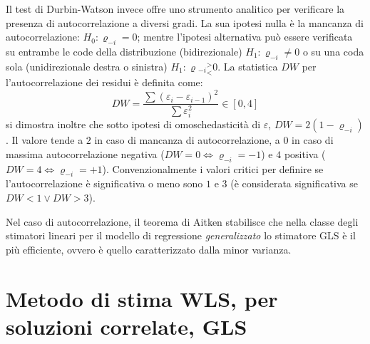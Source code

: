 \documentclass[a4page, 11pt]{article} %
\begin{document}
Il test di Durbin-Watson invece offre uno strumento analitico per verificare la presenza di autocorrelazione a diversi gradi.
La sua ipotesi nulla è la mancanza di autocorrelazione: $H_0: \varrho_{-i} = 0$; mentre l'ipotesi alternativa può essere verificata su entrambe le code della distribuzione (bidirezionale) $H_1: \varrho_{-i} \neq 0$ o su una coda sola (unidirezionale destra o sinistra) $H_1: \varrho{_{-i}} ^>_< 0$.
La statistica $DW$ per l'autocorrelazione dei residui è definita come:
\begin{equation*}
  DW = \frac{\sum{(\varepsilon_i - \varepsilon_{i-1})^2}}{\sum{ \varepsilon_i^2}} \in [0, 4]
\end{equation*}
si dimostra inoltre che sotto ipotesi di omoschedasticità di $\varepsilon$, $DW = 2(1 - \varrho_{-i})$.
Il valore tende a $2$ in caso di mancanza di autocorrelazione, a $0$ in caso di massima autocorrelazione negativa ($DW = 0 \Leftrightarrow \varrho_{-i} = -1$) e $4$ positiva ($DW = 4 \Leftrightarrow \varrho_{-i} = +1$).
Convenzionalmente i valori critici per definire se l'autocorrelazione è significativa o meno sono $1$ e $3$ (è considerata significativa se $DW < 1 \lor DW > 3$).

Nel caso di autocorrelazione, il teorema di Aitken stabilisce che nella classe degli stimatori lineari per il modello di regressione \textit{generalizzato} lo stimatore GLS è il più efficiente, ovvero è quello caratterizzato dalla minor varianza.

\section{Metodo di stima WLS, per soluzioni correlate, GLS }
\end{document}
